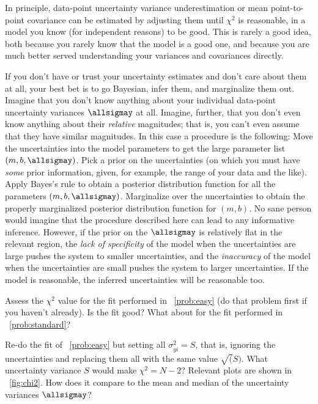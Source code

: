 \documentclass[12pt,twoside,pdftex]{article}
\begin{document}
In principle, data-point uncertainty variance underestimation or mean
point-to-point covariance can be estimated by adjusting them until
$\chi^2$ is reasonable, in a model you know (for independent reasons)
to be good.  This is rarely a good idea, both because you rarely know
that the model is a good one, and because you are much better served
understanding your variances and covariances directly.

If you don't have or trust your uncertainty estimates and don't care
about them at all, your best bet is to go Bayesian, infer them, and
marginalize them out.  Imagine that you don't know anything about your
individual data-point uncertainty variances $\allsigmay$ at all.
Imagine, further, that you don't even know anything about their
\emph{relative} magnitudes; that is, you can't even assume that they
have similar magnitudes.  In this case a procedure is the following:
Move the uncertainties into the model parameters to get the large
parameter list $(m,b,\allsigmay)$.  Pick a prior on the uncertainties
(on which you must have \emph{some} prior information, given, for
example, the range of your data and the like).  Apply Bayes's rule to
obtain a posterior distribution function for all the parameters
$(m,b,\allsigmay)$.  Marginalize over the uncertainties to obtain the
properly marginalized posterior distribution function for $(m,b)$.  No
sane person would imagine that the procedure described here can lead
to any informative inference.  However, if the prior on the
$\allsigmay$ is relatively flat in the relevant region, the \emph{lack
  of specificity} of the model when the uncertainties are large pushes
the system to smaller uncertainties, and the \emph{inaccuracy} of the
model when the uncertainties are small pushes the system to larger
uncertainties.  If the model is reasonable, the inferred uncertainties
will be reasonable too.

\begin{problem}
Assess the $\chi^2$ value for the fit performed in
\problemname~\ref{prob:easy} (do that problem first if you haven't
already).  Is the fit good?  What about for the fit performed in
\problemname~\ref{prob:standard}?
\end{problem}

\begin{problem}\label{prob:chi2}
Re-do the fit of \problemname~\ref{prob:easy} but setting all
$\sigma_{yi}^2=S$, that is, ignoring the uncertainties and replacing
them all with the same value $\sqrt(S)$.  What uncertainty variance $S$ would
make $\chi^2 = N-2$?  Relevant plots are shown in
\figurename~\ref{fig:chi2}.  How does it compare to the mean and
median of the uncertainty variances $\allsigmay$?
\end{problem}
\end{document}
